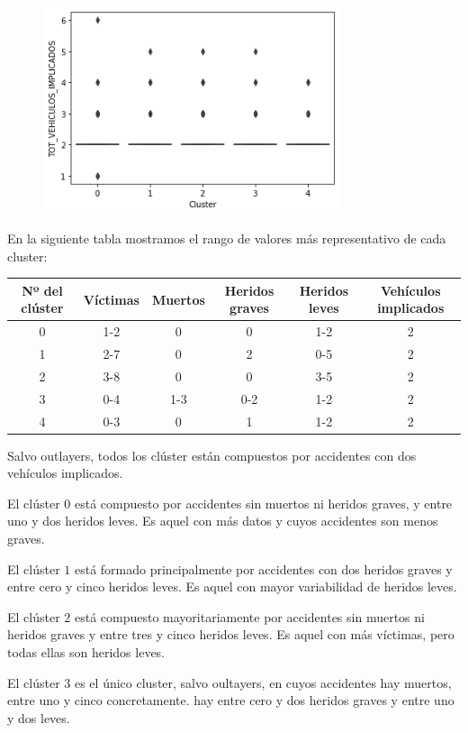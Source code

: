 \documentclass[a4]{article}
\begin{document}
\begin{figure}[H]
  \includegraphics[width=87mm]{imagenes/c1_kmeans_bp_vi}
\end{figure}

\newpage
En la siguiente tabla mostramos el rango de valores más representativo de cada cluster:

\begin{center}
\begin{tabular}{|c|c|c|c|c|c|}
\hline
\multicolumn{1}{|c|}{\textbf{Nº del clúster}} & \textbf{Víctimas} & \textbf{Muertos} & \textbf{Heridos graves} & \textbf{Heridos leves} & \textbf{Vehículos implicados}\\ \hline
  0  & 1-2 & 0   & 0   & 1-2 & 2 \\ \hline
  1  & 2-7 & 0   & 2   & 0-5 & 2 \\ \hline
  2  & 3-8 & 0   & 0   & 3-5 & 2 \\ \hline
  3  & 0-4 & 1-3 & 0-2 & 1-2 & 2 \\ \hline
  4  & 0-3 & 0   & 1   & 1-2 & 2 \\ \hline
\end{tabular}
\end{center}

Salvo outlayers, todos los clúster están compuestos por accidentes con dos vehículos implicados.

El clúster $0$ está compuesto por accidentes sin muertos ni heridos graves, y entre uno y dos heridos leves. Es aquel con más datos y cuyos accidentes son menos graves.

El clúster $1$ está formado principalmente por accidentes con dos heridos graves y entre cero y cinco heridos leves. Es aquel con mayor variabilidad de heridos leves.

El clúster $2$ está compuesto mayoritariamente por accidentes sin muertos ni heridos graves y entre tres y cinco heridos leves. Es aquel con más víctimas, pero todas ellas son heridos leves.

El clúster $3$ es el único cluster, salvo oultayers, en cuyos accidentes hay muertos, entre uno y cinco concretamente. hay entre cero y dos heridos graves y entre uno y dos leves.
\end{document}
